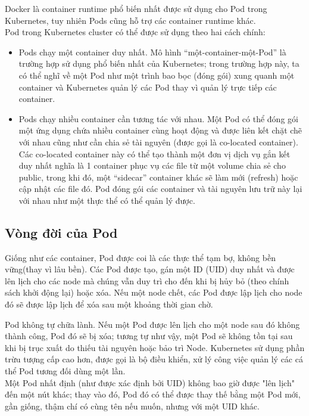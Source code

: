 \documentclass[12pt,a4paper]{report}
\begin{document}
				Docker là container runtime phổ biến nhất được sử dụng cho Pod trong Kubernetes, tuy nhiên Pods cũng hỗ trợ các container runtime khác.\\
				
				Pod trong Kubernetes cluster có thể được sử dụng theo hai cách chính:\\
				\begin{itemize}				
					\item Pods chạy một container duy nhất. Mô hình “một-container-một-Pod” là trường hợp sử dụng phổ biến nhất của Kubernetes; trong trường hợp này, ta có thể nghĩ về một Pod như một trình bao bọc (đóng gói) xung quanh một container và Kubernetes quản lý các Pod thay vì quản lý trực tiếp các container.
					\item Pods chạy nhiều container cần tương tác với nhau. Một Pod có thể đóng gói một ứng dụng chứa nhiều container cùng hoạt động và được liên kết chặt chẽ với nhau cũng như cần chia sẻ tài nguyên (được gọi là co-located container). Các co-located container này có thể tạo thành một đơn vị dịch vụ gắn kết duy nhất nghĩa là 1 container phục vụ các file từ một volume chia sẻ cho public, trong khi đó, một “sidecar” container khác sẽ làm mới (refresh) hoặc cập nhật các file đó. Pod đóng gói các container và tài nguyên lưu trữ này lại với nhau như một thực thể có thể quản lý được.
				\end{itemize}
			\subsection{Vòng đời của Pod}
				{\hspace{0.6cm}Giống như các container, Pod được coi là các thực thể tạm bợ, không bền vững(thay vì lâu bền). Các Pod được tạo, gán một ID (UID) duy nhất và được lên lịch cho các node mà chúng vẫn duy trì cho đến khi bị hủy bỏ (theo chính sách khởi động lại) hoặc xóa. Nếu một node chết, các Pod được lập lịch cho node đó sẽ được lập lịch để xóa sau một khoảng thời gian chờ.\\}
				
				Pod không tự chữa lành. Nếu một Pod được lên lịch cho một node sau đó không thành công, Pod đó sẽ bị xóa; tương tự như vậy, một Pod sẽ không tồn tại sau khi bị trục xuất do thiếu tài nguyên hoặc bảo trì Node. Kubernetes sử dụng phần trừu tượng cấp cao hơn, được gọi là bộ điều khiển, xử lý công việc quản lý các cá thể Pod tương đối dùng một lần.\\
				
				Một Pod nhất định (như được xác định bởi UID) không bao giờ được "lên lịch" đến một nút khác; thay vào đó, Pod đó có thể được thay thế bằng một Pod mới, gần giống, thậm chí có cùng tên nếu muốn, nhưng với một UID khác.\\
				
\end{document}
